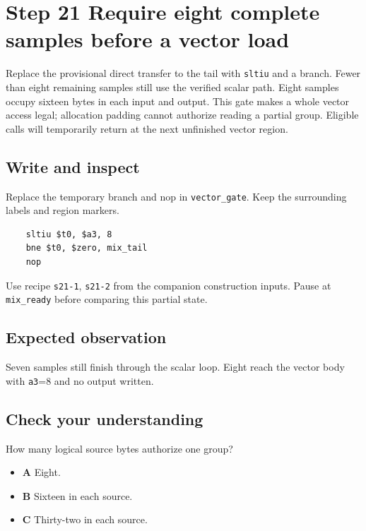 \section{Step 21 Require eight complete samples before a vector load}\label{pcm-s21}

Replace the provisional direct transfer to the tail with \texttt{sltiu} and a branch. Fewer than eight remaining samples still use the verified scalar path. Eight samples occupy sixteen bytes in each input and output. This gate makes a whole vector access legal; allocation padding cannot authorize reading a partial group. Eligible calls will temporarily return at the next unfinished vector region.

\subsection{Write and inspect}
Replace the temporary branch and nop in \texttt{vector\_gate}. Keep the surrounding labels and region markers.

\begin{verbatim}
    sltiu $t0, $a3, 8
    bne $t0, $zero, mix_tail
    nop
\end{verbatim}
Use recipe \texttt{s21-1}, \texttt{s21-2} from the companion construction inputs. Pause at \texttt{mix\_ready} before comparing this partial state.

\subsection{Expected observation}
Seven samples still finish through the scalar loop. Eight reach the vector body with \texttt{a3}=8 and no output written.

\subsection{Check your understanding}
How many logical source bytes authorize one group?

\begin{itemize}
\item \textbf{A} Eight.
\item \textbf{B} Sixteen in each source.
\item \textbf{C} Thirty-two in each source.
\end{itemize}
